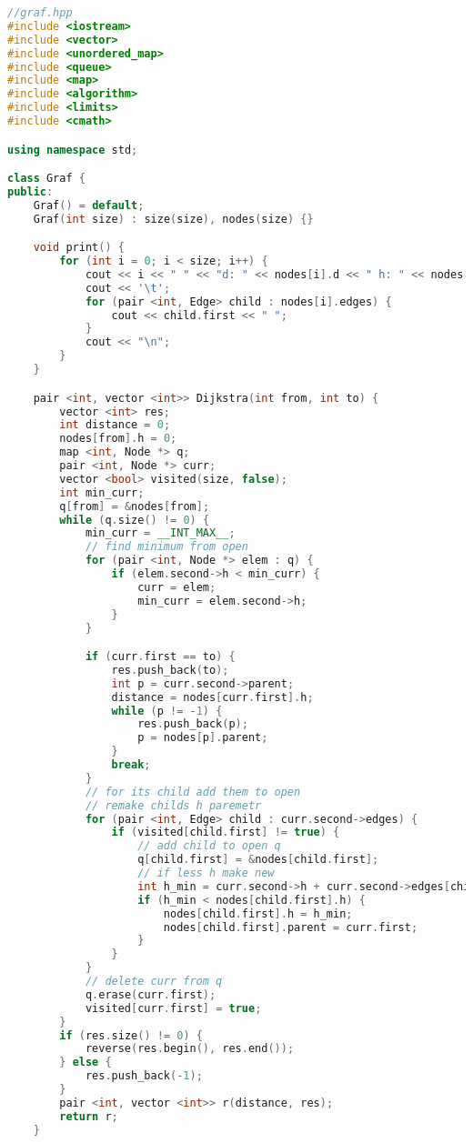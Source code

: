 \begin{lstlisting}[language=C++]
//graf.hpp
#include <iostream>
#include <vector>
#include <unordered_map>
#include <queue>
#include <map>
#include <algorithm>
#include <limits>
#include <cmath>

using namespace std;

class Graf {
public:
    Graf() = default;
    Graf(int size) : size(size), nodes(size) {}

    void print() {
        for (int i = 0; i < size; i++) {
            cout << i << " " << "d: " << nodes[i].d << " h: " << nodes[i].h << "\n";
            cout << '\t';
            for (pair <int, Edge> child : nodes[i].edges) {
                cout << child.first << " ";
            }
            cout << "\n";
        }
    }

    pair <int, vector <int>> Dijkstra(int from, int to) {
        vector <int> res;
        int distance = 0;
        nodes[from].h = 0;
        map <int, Node *> q;
        pair <int, Node *> curr;
        vector <bool> visited(size, false);
        int min_curr;
        q[from] = &nodes[from];
        while (q.size() != 0) {
            min_curr = __INT_MAX__;
            // find minimum from open
            for (pair <int, Node *> elem : q) {
                if (elem.second->h < min_curr) {
                    curr = elem;
                    min_curr = elem.second->h;
                }
            }

            if (curr.first == to) {
                res.push_back(to);
                int p = curr.second->parent;
                distance = nodes[curr.first].h;
                while (p != -1) {
                    res.push_back(p);
                    p = nodes[p].parent;
                }
                break;
            }
            // for its child add them to open
            // remake childs h paremetr
            for (pair <int, Edge> child : curr.second->edges) {
                if (visited[child.first] != true) {
                    // add child to open q
                    q[child.first] = &nodes[child.first];
                    // if less h make new
                    int h_min = curr.second->h + curr.second->edges[child.first].waight;
                    if (h_min < nodes[child.first].h) {
                        nodes[child.first].h = h_min;
                        nodes[child.first].parent = curr.first;
                    }
                }
            }
            // delete curr from q
            q.erase(curr.first);
            visited[curr.first] = true;
        }
        if (res.size() != 0) {
            reverse(res.begin(), res.end());
        } else {
            res.push_back(-1);
        }
        pair <int, vector <int>> r(distance, res);
        return r;
    }


\end{lstlisting}
